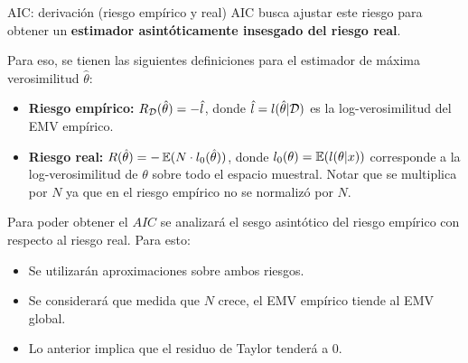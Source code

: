 \documentclass[9pt]{beamer}
\begin{document}
\begin{frame}{AIC: derivación (riesgo empírico y real)}
	AIC busca ajustar este riesgo para obtener un \textbf{estimador asintóticamente insesgado del riesgo real}.\\ \pause
	
Para eso, se tienen las siguientes definiciones para el estimador de máxima verosimilitud $\hat{\theta}$:

\begin{itemize}
	\item \textbf{Riesgo empírico:} $R_{\mathcal D}(\hat{\theta})=-\hat{l}$, donde $\hat{l}=l(\hat{\theta}|{\mathcal D})$ es la log-verosimilitud del EMV empírico. \pause
	\item \textbf{Riesgo real:} $R(\hat{\theta})=-\operatorname{\mathbb{E}}(N\cdot l_0(\hat{\theta}))$, donde $l_0(\theta)=\operatorname{\mathbb{E}}(l(\theta|x))$ corresponde a la log-verosimilitud de $\theta$ sobre todo el espacio muestral. Notar que se multiplica por $N$ ya que en el riesgo empírico no se normalizó por $N$. \pause
\end{itemize}

Para poder obtener el $AIC$ se analizará el sesgo asintótico del riesgo empírico con respecto al riesgo real. Para esto:

\begin{itemize}
	\item Se utilizarán aproximaciones sobre ambos riesgos. \pause
	\item Se considerará que medida que $N$ crece, el EMV empírico tiende al EMV global. \pause
	\item Lo anterior implica que el residuo de Taylor tenderá a 0.
\end{itemize}

\end{frame}
\end{document}
